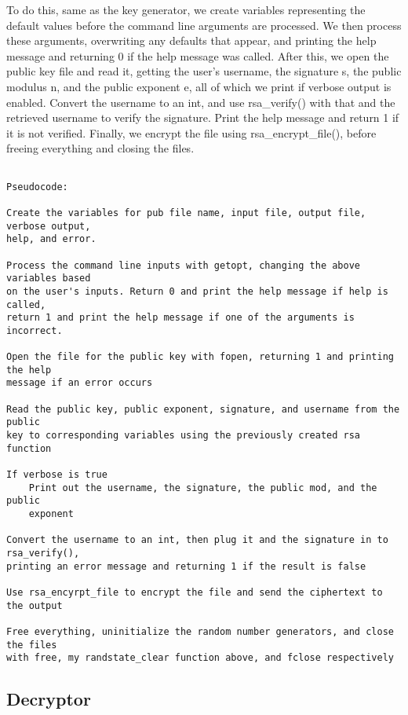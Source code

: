 \documentclass[11pt]{article}
\begin{document}
To do this, same as the key generator, we create variables representing the default values before the command line arguments are processed. We then process these arguments, overwriting any defaults that appear, and printing the help message and returning 0 if the help message was called. After this, we open the public key file and read it, getting the user's username, the signature s, the public modulus n, and the public exponent e, all of which we print if verbose output is enabled. Convert the username to an int, and use rsa\_verify() with that and the retrieved username to verify the signature. Print the help message and return 1 if it is not verified. Finally, we encrypt the file using rsa\_encrypt\_file(), before freeing everything and closing the files.

\begin{verbatim}

Pseudocode:

Create the variables for pub file name, input file, output file, verbose output,
help, and error.

Process the command line inputs with getopt, changing the above variables based
on the user's inputs. Return 0 and print the help message if help is called,
return 1 and print the help message if one of the arguments is incorrect.

Open the file for the public key with fopen, returning 1 and printing the help
message if an error occurs

Read the public key, public exponent, signature, and username from the public
key to corresponding variables using the previously created rsa function

If verbose is true
    Print out the username, the signature, the public mod, and the public
    exponent

Convert the username to an int, then plug it and the signature in to rsa_verify(),
printing an error message and returning 1 if the result is false

Use rsa_encyrpt_file to encrypt the file and send the ciphertext to the output

Free everything, uninitialize the random number generators, and close the files
with free, my randstate_clear function above, and fclose respectively

\end{verbatim}

\subsection{Decryptor}
\end{document}
